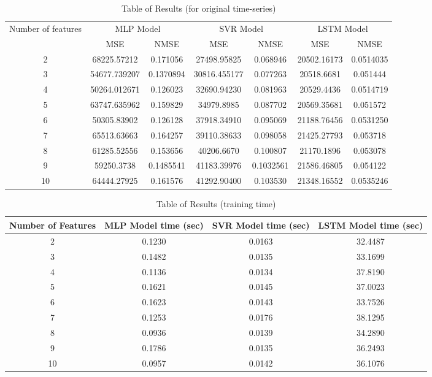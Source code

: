 \documentclass{article}
\begin{document}
\begin{table}[htb!]
	\begin{tabular}{ccccccc}
		\toprule
		\multirow{2}{*}{Number of features} & \multicolumn{2}{c}{MLP Model} & \multicolumn{2}{c}{SVR Model} & \multicolumn{2}{c}{LSTM Model} \\ 
		\cmidrule {2-7} & MSE & NMSE & MSE & NMSE & MSE & NMSE  \\
		\midrule
		2 & 68225.57212 & 0.171056 & 27498.95825 & 0.068946 & 20502.16173 & 0.0514035 \\
		\midrule
		3 & 54677.739207 & 0.1370894 & 30816.455177 & 0.077263 & 20518.6681 & 0.051444 \\
		\midrule
		4 & 50264.012671 & 0.126023 & 32690.94230 & 0.081963 & 20529.4436 & 0.0514719 \\
		\midrule
		5 & 63747.635962 & 0.159829 & 34979.8985 & 0.087702 & 20569.35681 & 0.051572 \\
		\midrule
		6 & 50305.83902 & 0.126128 & 37918.34910 & 0.095069 & 21188.76456 & 0.0531250 \\
		\midrule
		7 & 65513.63663 & 0.164257 & 39110.38633 & 0.098058 & 21425.27793 & 0.053718 \\
		\midrule
		8 & 61285.52556 & 0.153656 & 40206.6670 & 0.100807 & 21170.1896 & 0.053078 \\
		\midrule
		9 & 59250.3738 & 0.1485541 & 41183.39976 & 0.1032561 & 21586.46805 & 0.054122 \\
		\midrule
		10 & 64444.27925 & 0.161576 & 41292.90400 & 0.103530 & 21348.16552 & 0.0535246 \\
		\bottomrule
	\end{tabular}
	\caption{Table of Results (for original time-series)}
\end{table}

\begin{table}[htb!]
	\begin{tabular}{cccc}
		\toprule
		Number of Features & MLP Model time (sec) & SVR Model time (sec) & LSTM Model time (sec) \\
		\midrule 
		2 & 0.1230 & 0.0163 & 32.4487 \\ 
		\midrule
		3 & 0.1482 & 0.0135 & 33.1699 \\
		\midrule
		4 & 0.1136 & 0.0134 & 37.8190 \\
		\midrule
		5 & 0.1621 & 0.0145 & 37.0023 \\
		\midrule
		6 & 0.1623 & 0.0143 & 33.7526 \\
		\midrule
		7 & 0.1253 & 0.0176 & 38.1295 \\
		\midrule
		8 & 0.0936 & 0.0139 & 34.2890 \\
		\midrule
		9 & 0.1786 & 0.0135 & 36.2493 \\
		\midrule
		10 & 0.0957 & 0.0142 & 36.1076 \\
		\bottomrule
	\end{tabular}
	\caption{Table of Results (training time)}
\end{table}
\end{document}

